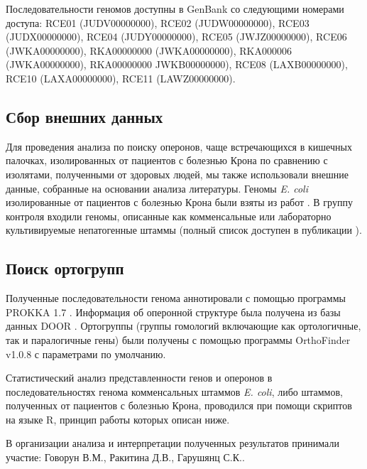 Последовательности геномов доступны в GenBank со следующими номерами доступа: RCE01 (JUDV00000000), RCE02 (JUDW00000000), RCE03 (JUDX00000000), RCE04 (JUDY00000000), RCE05 (JWJZ00000000), RCE06 (JWKA00000000), RKA00000000 (JWKA00000000), RKA000006 (JWKA00000000), RKA00000000 JWKB00000000), RCE08 (LAXB00000000), RCE10 (LAXA00000000), RCE11 (LAWZ00000000).

\subsection{Сбор внешних данных}
Для проведения анализа по поиску оперонов, чаще встречающихся в кишечных палочках, изолированных от пациентов с болезнью Крона по сравнению с изолятами, полученными от здоровых людей, мы также использовали внешние данные, собранные на основании анализа литературы. Геномы \textit{E. coli} изолированные от пациентов с болезнью Крона были взяты из работ \cite{nash2010genome, miquel2010complete, krause2011complete}. В группу контроля входили геномы, описанные как комменсальные или лабораторно культивируемые непатогенные штаммы (полный список доступен в публикации \cite{rakitina2017genome}).

\subsection{Поиск ортогрупп}
Полученные последовательности генома аннотировали с помощью программы PROKKA 1.7 \cite{seemann2014prokka}. Информация об оперонной структуре была получена из базы данных DOOR \cite{mao2014door}. Ортогруппы (группы гомологий включающие как ортологичные, так и паралогичные гены) были получены с помощью программы OrthoFinder v1.0.8 \cite{emms2015orthofinder} с параметрами по умолчанию. 

Статистический анализ представленности генов и оперонов в последовательностях генома комменсальных штаммов \textit{E. coli}, либо штаммов, полученных от пациентов с болезнью Крона, проводился при помощи скриптов на языке R, принцип работы которых описан ниже.

В организации анализа и интерпретации полученных результатов принимали участие: Говорун В.М., Ракитина Д.В., Гарушянц С.К..
